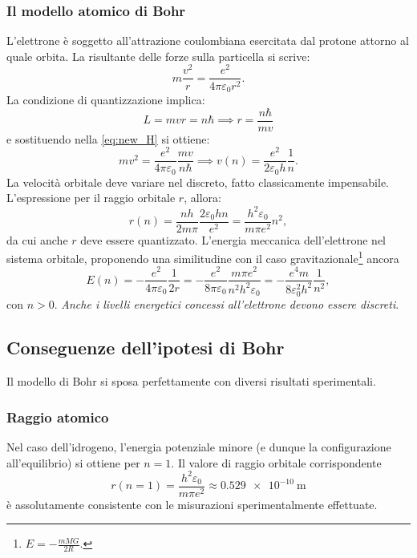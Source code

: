 \documentclass[a4paper,11pt]{report}
\begin{document}
\subsubsection{Il modello atomico di Bohr}
L'elettrone è soggetto all'attrazione coulombiana esercitata dal protone attorno al quale orbita. La risultante delle forze sulla particella si scrive:
\begin{equation}
m\frac{v^2}{r} = \frac{e^2}{4 \pi \varepsilon_0 r^2}.
\label{eq:new_H}
\end{equation}
La condizione di quantizzazione implica:
\begin{equation}
L = mvr = n\hbar \implies r = \frac{n\hbar}{mv}
\end{equation}
e sostituendo nella \eqref{eq:new_H} si ottiene:
\begin{equation}
mv^2 = \frac{e^2}{4\pi \varepsilon_0} \frac{mv}{n\hbar} \implies v(n) = \frac{e^2}{2\varepsilon_0 h}\frac{1}{n}.
\end{equation}
La velocità orbitale deve variare nel discreto, fatto classicamente impensabile. L'espressione per il raggio orbitale $r$, allora:
\begin{equation}
r(n) = \frac{nh}{2m\pi}\frac{2\varepsilon_0 h n}{e^2} = \frac{h^2\varepsilon_0}{m\pi e^2}n^2,
\end{equation}
da cui anche $r$ deve essere quantizzato. L'energia meccanica dell'elettrone nel sistema orbitale, proponendo una similitudine con il caso gravitazionale\footnote{$E = -\frac{mMG}{2R}$.} ancora
\begin{equation}
E(n) = -\frac{e^2}{4\pi\varepsilon_0}\frac{1}{2r} = -\frac{e^2}{8\pi\varepsilon_0} \frac{m\pi e^2}{n^2 h^2 \varepsilon_0} = -\frac{e^4 m}{8\varepsilon_0^2 h^2}\frac{1}{n^2},
\label{eq:E_bohr}
\end{equation}
con $n > 0$. \textit{Anche i livelli energetici concessi all'elettrone devono essere discreti}. 

\subsection{Conseguenze dell'ipotesi di Bohr}
Il modello di Bohr si sposa perfettamente con diversi risultati sperimentali.

\subsubsection{Raggio atomico}
Nel caso dell'idrogeno, l'energia potenziale minore (e dunque la configurazione all'equilibrio) si ottiene per $n = 1$. Il valore di raggio orbitale corrispondente
\begin{equation}
r(n = 1) = \frac{h^2\varepsilon_0}{m\pi e^2} \approx \SI{0.529e-10}{\meter}
\end{equation}
è assolutamente consistente con le misurazioni sperimentalmente effettuate.
 
\end{document}
